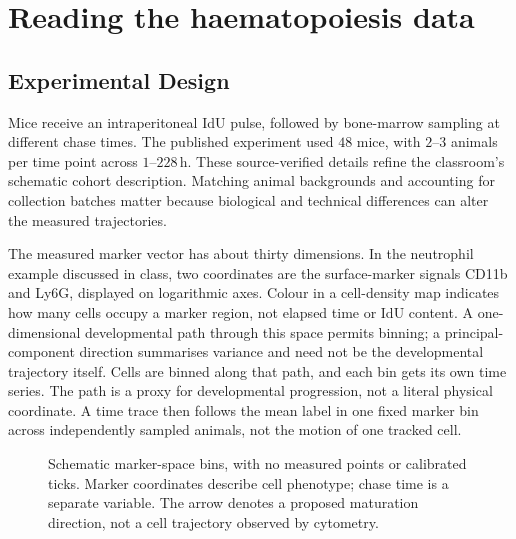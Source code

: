 \section{Reading the haematopoiesis data}\label{sec:lec02:data}

\subsection*{Experimental Design}
Mice receive an intraperitoneal IdU pulse, followed by bone-marrow sampling at different chase times. The published experiment used $48$ mice, with $2$--$3$ animals per time point across $1$--$228$\,h. These source-verified details refine the classroom's schematic cohort description. Matching animal backgrounds and accounting for collection batches matter because biological and technical differences can alter the measured trajectories.

The measured marker vector has about thirty dimensions. In the neutrophil example discussed in class, two coordinates are the surface-marker signals CD11b and Ly6G, displayed on logarithmic axes. Colour in a cell-density map indicates how many cells occupy a marker region, not elapsed time or IdU content. A one-dimensional developmental path through this space permits binning; a principal-component direction summarises variance and need not be the developmental trajectory itself. Cells are binned along that path, and each bin gets its own time series. The path is a proxy for developmental progression, not a literal physical coordinate. A time trace then follows the mean label in one fixed marker bin across independently sampled animals, not the motion of one tracked cell.

\begin{figure}[htbp]
\centering
{}
\caption{Schematic marker-space bins, with no measured points or calibrated ticks. Marker coordinates describe cell phenotype; chase time is a separate variable. The arrow denotes a proposed maturation direction, not a cell trajectory observed by cytometry.}\label{fig:lec02-marker-space}
\end{figure}


